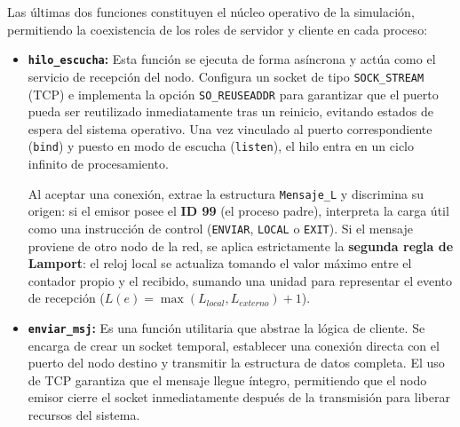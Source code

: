 Las últimas dos funciones constituyen el núcleo operativo de la simulación, permitiendo la coexistencia de los roles de servidor y cliente en cada proceso:

\begin{itemize}
    \item \textbf{\texttt{hilo\_escucha}:} Esta función se ejecuta de forma asíncrona y actúa como el servicio de recepción del nodo. Configura un socket de tipo \texttt{SOCK\_STREAM} (TCP) e implementa la opción \texttt{SO\_REUSEADDR} para garantizar que el puerto pueda ser reutilizado inmediatamente tras un reinicio, evitando estados de espera del sistema operativo. Una vez vinculado al puerto correspondiente (\texttt{bind}) y puesto en modo de escucha (\texttt{listen}), el hilo entra en un ciclo infinito de procesamiento. 
    
    Al aceptar una conexión, extrae la estructura \texttt{Mensaje\_L} y discrimina su origen: si el emisor posee el \textbf{ID 99} (el proceso padre), interpreta la carga útil como una instrucción de control (\texttt{ENVIAR}, \texttt{LOCAL} o \texttt{EXIT}). Si el mensaje proviene de otro nodo de la red, se aplica estrictamente la \textbf{segunda regla de Lamport}: el reloj local se actualiza tomando el valor máximo entre el contador propio y el recibido, sumando una unidad para representar el evento de recepción ($L(e) = \max(L_{local}, L_{externo}) + 1$).

    \item \textbf{\texttt{enviar\_msj}:} Es una función utilitaria que abstrae la lógica de cliente. Se encarga de crear un socket temporal, establecer una conexión directa con el puerto del nodo destino y transmitir la estructura de datos completa. El uso de TCP garantiza que el mensaje llegue íntegro, permitiendo que el nodo emisor cierre el socket inmediatamente después de la transmisión para liberar recursos del sistema.
\end{itemize}


